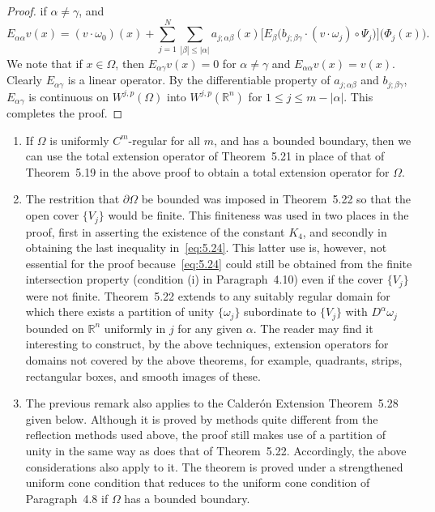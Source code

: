 \begin{proof}
  if $\alpha\neq\gamma$, and
  \[ E_{\alpha\alpha} v(x) = (v\cdot \omega_0)(x)
      + \sum_{j=1}^N \sum_{|\beta|\leq |\alpha|}
      a_{j;\alpha\beta}(x) \bigl[E_{\beta} \bigl(b_{j;\beta\gamma}
      \cdot (v\cdot\omega_j) \circ \Psi_j\bigr)\bigr] \bigl(\Phi_j(x)\bigr). \]
  We note that if $x\in\Omega$, then $E_{\alpha\gamma} v(x) = 0$
  for $\alpha\neq\gamma$ and $E_{\alpha\alpha} v(x) = v(x)$.
  Clearly $E_{\alpha\gamma}$ is a linear operator. By the differentiable
  property of $a_{j;\alpha\beta}$ and $b_{j;\beta\gamma}$, $E_{\alpha\gamma}$
  is continuous on $W^{j,p}(\Omega)$ into $W^{j,p}(\mathbb{R}^n)$
  for $1\leq j\leq m-|\alpha|$. This completes the proof.
\end{proof}


\begin{remarks}
  \begin{enumerate}
    \item If $\Omega$ is uniformly $C^m$-regular for all $m$, and has a
      bounded boundary, then we can use the total extension operator of
      Theorem~5.21 in place of that of Theorem~5.19 in the above proof
      to obtain a total extension operator for $\Omega$.
    \item The restrition that $\partial\Omega$ be bounded was imposed in
      Theorem~5.22 so that the open cover $\{V_j\}$ would be finite. This
      finiteness was used in two places in the proof, first in asserting
      the existence of the constant $K_4$, and secondly in obtaining the
      last inequality in~\eqref{eq:5.24}. This latter use is, however, not
      essential for the proof because~\eqref{eq:5.24} could still be
      obtained from the finite intersection property (condition (i) in
      Paragraph~4.10) even if the cover $\{V_j\}$ were not finite.
      Theorem~5.22 extends to any suitably regular domain for which there
      exists a partition of unity $\{\omega_j\}$ subordinate to $\{V_j\}$
      with $D^{\alpha} \omega_j$ bounded on $\mathbb{R}^n$ uniformly in $j$
      for any given $\alpha$. The reader may find it interesting to construct,
      by the above techniques, extension operators for domains not covered
      by the above theorems, for example, quadrants, strips, rectangular boxes,
      and smooth images of these.
    \item The previous remark also applies to the Calder\'on Extension Theorem~5.28
      given below. Although it is proved by methods quite different from the
      reflection methods used above, the proof still makes use of a partition
      of unity in the same way as does that of Theorem~5.22. Accordingly,
      the above considerations also apply to it. The theorem is proved under
      a strengthened uniform cone condition that reduces to the uniform cone
      condition of Paragraph~4.8 if $\Omega$ has a bounded boundary.
  \end{enumerate}
\end{remarks}

